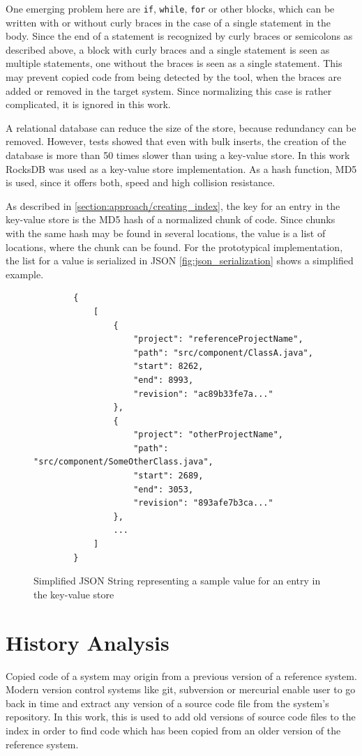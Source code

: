 One emerging problem here are \texttt{if}, \texttt{while}, \texttt{for} or other blocks, which can be written with or without curly braces in the case of a single statement in the body.
Since the end of a statement is recognized by curly braces or semicolons as described above, a block with curly braces and a single statement is seen as multiple statements, one without the braces is seen as a single statement.
This may prevent copied code from being detected by the tool, when the braces are added or removed in the target system.
Since normalizing this case is rather complicated, it is ignored in this work.

A relational database can reduce the size of the store, because redundancy can be removed.
However, tests showed that even with bulk inserts, the creation of the database is more than 50 times slower than using a key-value store.
In this work RocksDB was used as a key-value store implementation.
As a hash function, MD5 is used, since it offers both, speed and high collision resistance.

As described in \autoref{section:approach/creating_index}, the key for an entry in the key-value store is the MD5 hash of a normalized chunk of code.
Since chunks with the same hash may be found in several locations, the value is a list of locations, where the chunk can be found.
For the prototypical implementation, the list for a value is serialized in JSON
\autoref{fig:json_serialization} shows a simplified example.

\begin{figure}[h]
	\centering
	\begin{lstlisting}
		{
			[
				{
					"project": "referenceProjectName",
					"path": "src/component/ClassA.java",
					"start": 8262,
					"end": 8993,
					"revision": "ac89b33fe7a..."
				},
				{
					"project": "otherProjectName",
					"path": "src/component/SomeOtherClass.java",
					"start": 2689,
					"end": 3053,
					"revision": "893afe7b3ca..."
				},
				...
			]
		}
	\end{lstlisting}
	\caption{Simplified JSON String representing a sample value for an entry in the key-value store}\label{fig:json_serialization}
\end{figure}

\section{History Analysis}\label{section:implementation/history_analysis}
Copied code of a system may origin from a previous version of a reference system.
Modern version control systems like git, subversion or mercurial enable user to go back in time and extract any version of a source code file from the system's repository.
In this work, this is used to add old versions of source code files to the index in order to find code which has been copied from an older version of the reference system.

